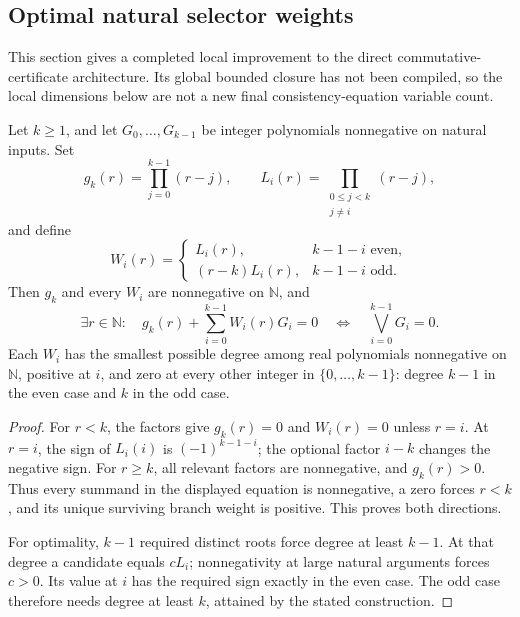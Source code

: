 \subsection{Optimal natural selector weights}
\label{sec:natural-selectors}

This section gives a completed local improvement to the direct
commutative-certificate architecture.  Its global bounded closure has not
been compiled, so the local dimensions below are not a new final
consistency-equation variable count.

\begin{theorem}
Let $k\geq1$, and let $G_0,\ldots,G_{k-1}$ be integer polynomials
nonnegative on natural inputs.  Set
\[
 g_k(r)=\prod_{j=0}^{k-1}(r-j),\qquad
 L_i(r)=\prod_{\substack{0\leq j<k\\j\ne i}}(r-j),
\]
and define
\[
 W_i(r)=
 \begin{cases}
 L_i(r),&k-1-i\text{ even},\\
 (r-k)L_i(r),&k-1-i\text{ odd}.
 \end{cases}
\]
Then $g_k$ and every $W_i$ are nonnegative on $\mathbb N$, and
\[
 \exists r\in\mathbb N:\quad
 g_k(r)+\sum_{i=0}^{k-1}W_i(r)G_i=0
 \quad\Longleftrightarrow\quad
 \bigvee_{i=0}^{k-1}G_i=0.
\]
Each $W_i$ has the smallest possible degree among real polynomials
nonnegative on $\mathbb N$, positive at $i$, and zero at every other
integer in $\{0,\ldots,k-1\}$: degree $k-1$ in the even case and $k$
in the odd case.
\end{theorem}
\begin{proof}
For $r<k$, the factors give $g_k(r)=0$ and $W_i(r)=0$ unless $r=i$.
At $r=i$, the sign of $L_i(i)$ is $(-1)^{k-1-i}$; the optional factor
$i-k$ changes the negative sign.  For $r\geq k$, all relevant factors
are nonnegative, and $g_k(r)>0$.  Thus every summand in the displayed
equation is nonnegative, a zero forces $r<k$, and its unique surviving
branch weight is positive.  This proves both directions.

For optimality, $k-1$ required distinct roots force degree at least
$k-1$.  At that degree a candidate equals $cL_i$; nonnegativity at
large natural arguments forces $c>0$.  Its value at $i$ has the required
sign exactly in the even case.  The odd case therefore needs degree at
least $k$, attained by the stated construction.
\end{proof}

